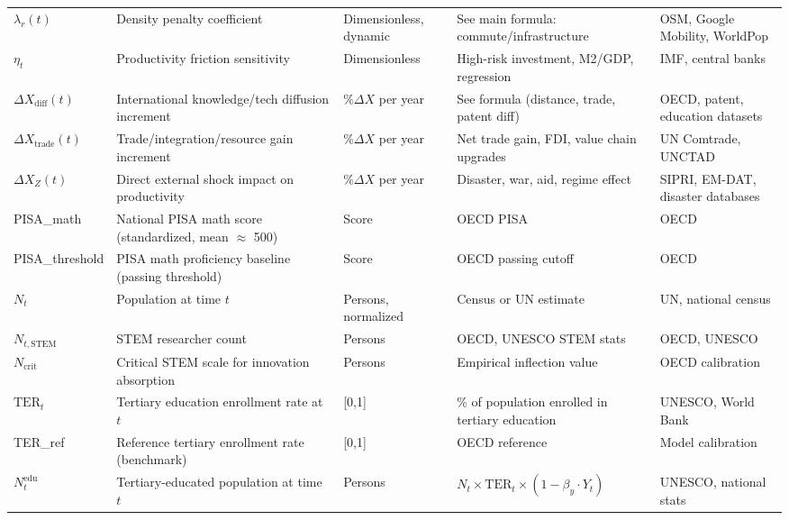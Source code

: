 \documentclass[12pt]{article}
\begin{document}
\begin{longtable}{|p{2.8cm}|p{4.3cm}|p{2.0cm}|p{3.0cm}|p{3.0cm}|}
$\lambda_r(t)$ & Density penalty coefficient & Dimensionless, dynamic & See main formula: commute/infrastructure & OSM, Google Mobility, WorldPop \\
$\eta_t$ & Productivity friction sensitivity & Dimensionless & High-risk investment, M2/GDP, regression & IMF, central banks \\
$\Delta X_{\text{diff}}(t)$ & International knowledge/tech diffusion increment & $\%\Delta X$ per year & See formula (distance, trade, patent diff) & OECD, patent, education datasets \\
$\Delta X_{\text{trade}}(t)$ & Trade/integration/resource gain increment & \%$\Delta X$ per year & Net trade gain, FDI, value chain upgrades & UN Comtrade, UNCTAD \\
$\Delta X_Z(t)$ & Direct external shock impact on productivity & $\%\Delta X$ per year & Disaster, war, aid, regime effect & SIPRI, EM-DAT, disaster databases \\
PISA\_math & National PISA math score (standardized, mean $\approx$ 500) & Score & OECD PISA & OECD \\
PISA\_threshold & PISA math proficiency baseline (passing threshold) & Score & OECD passing cutoff & OECD \\
$N_t$ & Population at time $t$ & Persons, normalized & Census or UN estimate & UN, national census \\
$N_{t,\text{STEM}}$ & STEM researcher count & Persons & OECD, UNESCO STEM stats & OECD, UNESCO \\
$N_{\text{crit}}$ & Critical STEM scale for innovation absorption & Persons & Empirical inflection value & OECD calibration \\
$\text{TER}_t$ & Tertiary education enrollment rate at $t$ & [0,1] & \% of population enrolled in tertiary education & UNESCO, World Bank \\
TER\_ref & Reference tertiary enrollment rate (benchmark) & [0,1] & OECD reference & Model calibration \\
$N_t^{\text{edu}}$ & Tertiary-educated population at time $t$ & Persons & $N_t \times \text{TER}_t \times (1 - \beta_y \cdot Y_t)$ & UNESCO, national stats \\

\end{longtable}
\end{document}
